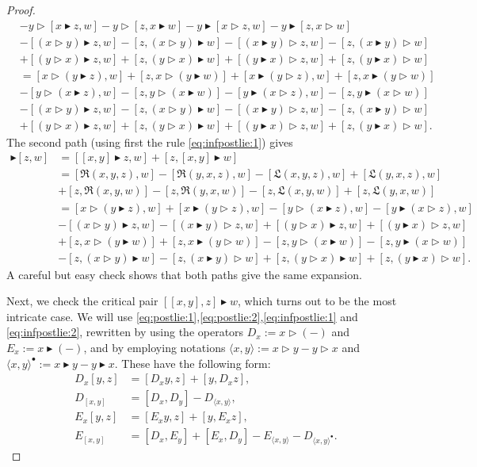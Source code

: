 \documentclass[10pt]{article}
\theoremstyle{definition}
\newcommand{\wt}{\vartriangleright}
\newcommand{\bt}{\blacktriangleright}
\newcommand{\R}{\mathfrak{R}}
\renewcommand{\L}{\mathfrak{L}}
\newcommand{\ab}[2]{\langle #1,#2\rangle}
\newcommand{\abd}[2]{\langle #1,#2\rangle^{\bullet}}
\begin{document}
\begin{proof}
\begin{align*}
& - y \wt [x \bt z,w] - y \wt [z, x \bt w] - y \bt [x \wt z,w] - y \bt [z, x \wt w]\\
&- [(x \wt y)\bt z,w] -[z,(x \wt y)\bt w] - [(x \bt y)\wt z,w] -[z,(x \bt y)\wt w] \\
&+  [(y \wt x)\bt z,w] +[z,(y \wt x)\bt w] + [(y \bt x)\wt z,w] +[z,(y \bt x)\wt w]\\
&=[x \wt (y \bt z),w] + [z, x \wt (y \bt w)] + [x \bt (y \wt z),w]  + [z, x \bt (y \wt w)]\\
& - [y \wt (x \bt z),w] - [z, y \wt (x \bt w)]- [y \bt (x \wt z),w]  - [z, y \bt (x \wt w)]\\
&- [(x \wt y)\bt z,w] -[z,(x \wt y)\bt w] - [(x \bt y)\wt z,w] -[z,(x \bt y)\wt w] \\
&+  [(y \wt x)\bt z,w] +[z,(y \wt x)\bt w] + [(y \bt x)\wt z,w] +[z,(y \bt x)\wt w] .
\end{align*}
\endgroup
The second path (using first the rule \eqref{eq:infpostlie:1}) gives
\begingroup
\allowdisplaybreaks
\begin{align*}
[x,y] \bt [z,w] &= [[x,y] \bt z, w] + [z, [x,y] \bt w] \\
&= [\R(x,y,z),w] - [\R(y,x,z),w] - [\L(x,y,z),w] + [\L(y,x,z),w] \\
& + [z,\R(x,y,w)] - [z,\R(y,x,w)] - [z, \L(x,y,w)] + [z,\L(y,x,w)]\\
&= [x \wt (y \bt z),w] + [x \bt (y \wt z),w] - [y \wt (x \bt z),w] - [y \bt (x \wt z),w]\\
&- [(x \wt y) \bt z,w] - [(x \bt y)\wt z,w] + [(y \wt x) \bt z,w] + [(y \bt x)\wt z,w]\\
& + [z, x \wt (y \bt w)] +  [z, x \bt (y \wt w)] - [z, y \wt (x \bt w)] - [z, y \bt (x \wt w)]\\
& - [z, (x \wt y) \bt w] - [z, (x \bt y) \wt w] + [z, (y \wt x) \bt w] + [z, (y \bt x) \wt w].
\end{align*}
A careful but easy check shows that both paths give the same expansion.
\endgroup

\medskip\medskip
Next, we check the critical pair $[[x,y],z]\bt w$, which turns out to be the most intricate case. We will use \eqref{eq:postlie:1},\eqref{eq:postlie:2},\eqref{eq:infpostlie:1} and \eqref{eq:infpostlie:2}, rewritten by using the operators $D_{x}:=x\wt(-)$ and $E_{x}:=x\bt(-)$, and by employing notations $\ab{x}{y} := x\wt y-y\wt x$ and $\abd{x}{y} := x\bt y-y\bt x$. These have the following form:
\begin{align}
D_x[y,z] &= [D_xy,z]+[y,D_xz],\label{PL1'}\\
D_{[x,y]} &= [D_x,D_y]-D_{\ab{x}{y}},\label{PL2'}\\
E_x[y,z] &= [E_xy,z]+[y,E_xz],\label{IPL1'}\\
E_{[x,y]} &= [D_x,E_y]+[E_x,D_y]-E_{\ab{x}{y}}-D_{\abd{x}{y}}\label{IPL2'}.
\end{align} 


\end{proof}
\end{document}
